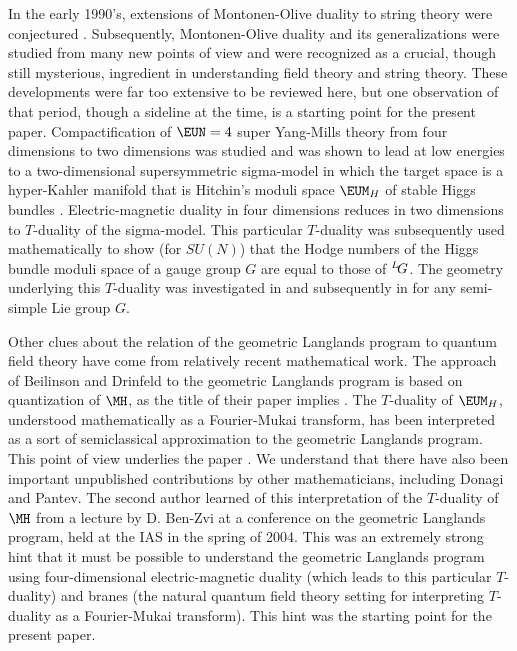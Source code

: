  In the early 1990's, extensions of
Montonen-Olive duality to string theory were conjectured
\cite{ref17}. Subsequently, Montonen-Olive duality and its
generalizations were studied from many new points of view and were
recognized as a crucial, though still mysterious, ingredient in
understanding field theory and string theory.  These developments
were far too extensive to be reviewed here, but one observation of
that period, though a sideline at the time, is a starting point
for the present paper. Compactification of ${\EUN}=4$ super
Yang-Mills theory from four dimensions to two dimensions was
studied \cite{ref18,ref19} and was shown to lead at low energies to
a two-dimensional supersymmetric sigma-model in which the target
space is a hyper-Kahler manifold that is Hitchin's moduli space
${\EUM}_H$ of stable Higgs bundles
 \cite{ref20}.
 Electric-magnetic duality in four dimensions
reduces in two dimensions to $T$-duality of the sigma-model.  This
particular $T$-duality was subsequently used mathematically
\cite{ref21} to show (for $SU(N)$) that
the Hodge numbers of the Higgs bundle moduli space of a gauge
group $G$ are equal to those of $^L\negthinspace G$. The geometry
underlying this $T$-duality was investigated in \cite{ref22} and
subsequently in \cite{ref23} for any
semi-simple Lie group $G$.

Other clues about the relation of the geometric Langlands program
to quantum field theory have come from relatively recent
mathematical work. The approach of Beilinson and Drinfeld to the
geometric Langlands program is based on quantization of $\MH$, as
the title of their paper implies \cite{ref5}. The $T$-duality of
${\EUM}_H$, understood mathematically as a Fourier-Mukai
transform, has been interpreted as a sort of semiclassical
approximation to the geometric Langlands program. This point of
view underlies the paper \cite{ref24}. We understand that there have also been
important unpublished contributions by other mathematicians,
including Donagi and Pantev. The second author learned of this
interpretation of the $T$-duality of $\MH$ from a lecture by D.
Ben-Zvi at a conference on the geometric Langlands program, held
at the IAS in the spring of 2004. This was an extremely strong
hint that it must be possible to understand the geometric
Langlands program using four-dimensional electric-magnetic duality
(which leads to this particular $T$-duality) and branes (the
natural quantum field theory setting for interpreting $T$-duality
as a Fourier-Mukai transform).  This hint was the starting point
for the present paper.

